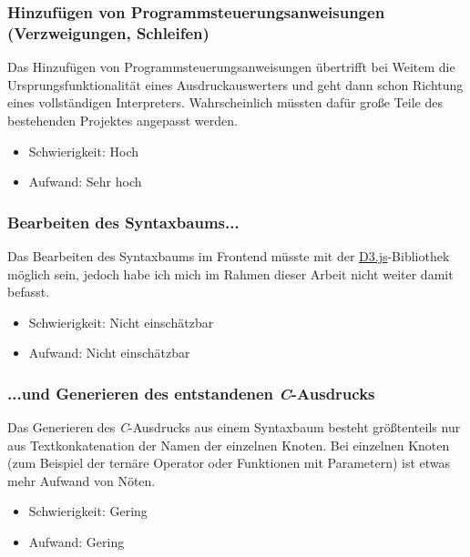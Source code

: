 \documentclass[oneside]{ausarbeitung}
\begin{document}
\subsubsection{Hinzufügen von Programmsteuerungsanweisungen (Verzweigungen, Schleifen)}
Das Hinzufügen von Programmsteuerungsanweisungen übertrifft bei Weitem die Ursprungsfunktionalität eines Ausdruckauswerters und geht dann schon Richtung eines vollständigen Interpreters. Wahrscheinlich müssten dafür große Teile des bestehenden Projektes angepasst werden.
\begin{itemize}
\item{Schwierigkeit: Hoch}
\item{Aufwand: Sehr hoch}
\end{itemize}
\subsubsection{Bearbeiten des Syntaxbaums...}
Das Bearbeiten des Syntaxbaums im Frontend müsste mit der \hyperref[sub:d3js]{D3.js}-Bibliothek möglich sein, jedoch habe ich mich im Rahmen dieser Arbeit nicht weiter damit befasst.
\begin{itemize}
\item{Schwierigkeit: Nicht einschätzbar}
\item{Aufwand: Nicht einschätzbar}
\end{itemize}
\subsubsection{...und Generieren des entstandenen \textit{C}-Ausdrucks}
Das Generieren des \textit{C}-Ausdrucks aus einem Syntaxbaum besteht größtenteils nur aus Textkonkatenation der Namen der einzelnen Knoten. Bei einzelnen Knoten (zum Beispiel der ternäre Operator oder Funktionen mit Parametern) ist etwas mehr Aufwand von Nöten.
\begin{itemize}
\item{Schwierigkeit: Gering}
\item{Aufwand: Gering}
\end{itemize}


\appendix

\printbibliography


\end{document}
